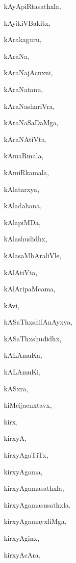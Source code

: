 \begin{multicols}{2}
{kAyApiRtasathxla}, \pageref{kAyApiRtasathxla}

{kAyikiVBakitx}, \pageref{kAyikiVBakitx}

{kArakaguru}, \pageref{kArakaguru}

{kAraNa}, \pageref{kAraNa}

{kAraNajAcnxni}, \pageref{kAraNajAcnxni}

{kAraNatanu}, \pageref{kAraNatanu}

{kAraNashariVra}, \pageref{kAraNashariVra}

{kAraNaSaDaMga}, \pageref{kAraNaSaDaMga}

{kAraNAtiVta}, \pageref{kAraNAtiVta}

{kAmaRmala}, \pageref{kAmaRmala}

{kAmiRkamala}, \pageref{kAmiRkamala}

{kAlatarxya}, \pageref{kAlatarxya}

{kAladahana}, \pageref{kAladahana}

{kAlapiMDa}, \pageref{kAlapiMDa}

{kAlashudidhx}, \pageref{kAlashudidhx}

{kAlasaMhAraliVle}, \pageref{kAlasaMhAraliVle}

{kAlAtiVta}, \pageref{kAlAtiVta}

{kAlAripaMcama}, \pageref{kAlAripaMcama}

{kAvi}, \pageref{kAvi}

{kASaThxshilAnAyxya}, \pageref{kASaThxshilAnAyxya}

{kASaThxshudidhx}, \pageref{kASaThxshudidhx}

{kALAmuKa}, \pageref{kALAmuKa}

{kALAmuKi}, \pageref{kALAmuKi}

{kASxra}, \pageref{kASxra}

{kiMcijacnxtavx}, \pageref{kiMcijacnxtavx}

{kirx}, \pageref{kirx}

{kirxyA}, \pageref{kirxyA}

{kirxyAgaTiTx}, \pageref{kirxyAgaTiTx}

{kirxyAgama}, \pageref{kirxyAgama}

{kirxyAgamasathxla}, \pageref{kirxyAgamasathxla}

{kirxyAgamasusathxla}, \pageref{kirxyAgamasusathxla}

{kirxyAgamayxliMga}, \pageref{kirxyAgamayxliMga}

{kirxyAginx}, \pageref{kirxyAginx}

{kirxyAcAra}, \pageref{kirxyAcAra}


\end{multicols}
